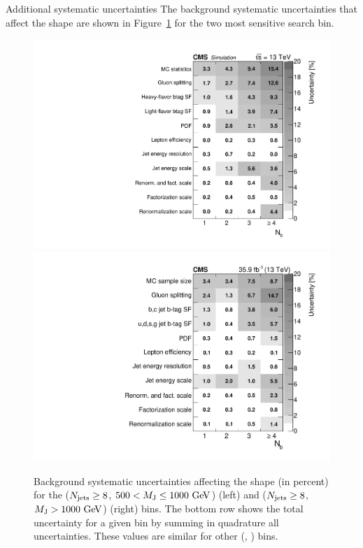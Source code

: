 \begin{section}{Additional systematic uncertainties}
The background systematic uncertainties that affect the \Nb shape are shown in Figure~\ref{fig:bkg_sys_tables} for the two most sensitive search bin.

\begin{figure}[tbp!]
\begin{center}
\includegraphics[angle=0,width=0.45\columnwidth]{fig/table_bkg_systs_bin20.pdf}
\includegraphics[angle=0,width=0.45\columnwidth]{fig/table_bkg_systs_bin21.pdf}
\end{center}
\caption{Background systematic uncertainties affecting the \Nb shape (in percent) for the ($N_{\mathrm{jets}} \geq 8$, $500 < M_\mathrm{J} \leq 1000~\mathrm{Ge\kern -0.1em V}$) (left) and ($N_{\mathrm{jets}} \geq 8$, $M_\mathrm{J} > 1000~\mathrm{Ge\kern -0.1em V}$) (right) bins. The bottom row shows the total uncertainty for a given \Nb bin by summing in quadrature all uncertainties. These values are similar for other (\Njets, \MJ) bins.}
\label{fig:bkg_sys_tables}
\end{figure}

\end{section}

